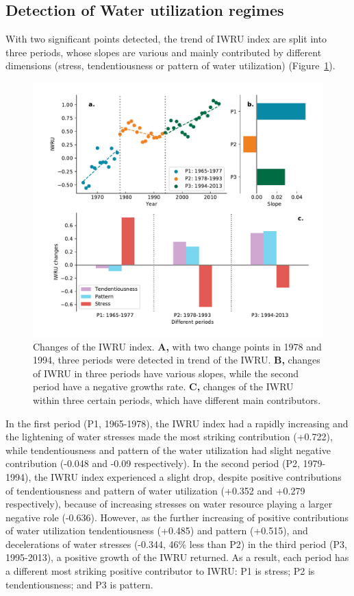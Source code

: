 \documentclass[9pt, twocolumn, twoside, lineno]{pnas-new}
\begin{document}
\subsection*{Detection of Water utilization regimes}
With two significant points detected, the trend of IWRU index are split into three periods, whose slopes are various and mainly contributed by different dimensions (stress, tendentiousness or pattern of water utilization) (Figure~\ref{fig:IWRU}).
\begin{figure}%
	\centering
	\includegraphics[width=\linewidth]{../../figures/main_text/index.pdf}
	\caption{Changes of the IWRU index. 
	\textbf{A,} with two change points in 1978 and 1994, three periods were detected in trend of the IWRU.
	\textbf{B,} changes of IWRU in three periods have various slopes, while the second period have a negative growths rate.
	\textbf{C,} changes of the IWRU within three certain periods, which have different main contributors.
	}
	\label{fig:IWRU}
\end{figure}
In the first period (P1, 1965-1978), the IWRU index had a rapidly increasing and the lightening of water stresses made the most striking contribution (+0.722), while tendentiousness and pattern of the water utilization had slight negative contribution (-0.048 and -0.09 respectively).
In the second period (P2, 1979-1994), the IWRU index experienced a slight drop, despite positive contributions of tendentiousness and pattern of water utilization (+0.352 and +0.279 respectively), because of increasing stresses on water resource playing a larger negative role (-0.636). 
However, as the further increasing of positive contributions of water utilization tendentiousness (+0.485) and pattern (+0.515), and decelerations of water stresses (-0.344, 46\% less than P2) in the third period (P3, 1995-2013), a positive growth of the IWRU returned.
As a result, each period has a different most striking positive contributor to IWRU: P1 is stress; P2 is tendentiousness; and P3 is pattern.
\end{document}
